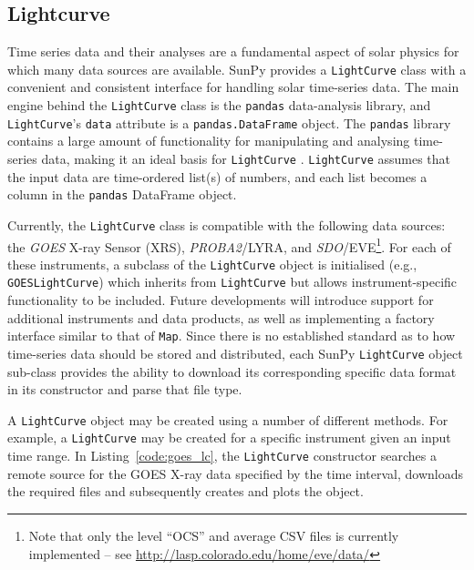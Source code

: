 \subsection{Lightcurve}\label{ssec:lightcurve}

Time series data and their analyses are a fundamental aspect of solar
physics for which many data sources are available.
SunPy provides a \texttt{LightCurve} class
with a convenient and consistent interface for handling solar time-series
data.  The main engine behind the \texttt{LightCurve} class is
the {\texttt{pandas}} data-analysis library, and 
\texttt{LightCurve}'s \texttt{data} attribute is a \texttt{pandas.DataFrame} 
object. The \texttt{pandas} library contains a large amount
of functionality for manipulating and analysing time-series data,
making it an ideal basis for \texttt{LightCurve} \citep{mckinney2012}.  \texttt{LightCurve}
assumes that the input data are time-ordered list(s) of numbers, and each
list becomes a column in the \texttt{pandas} DataFrame object.

Currently, the \texttt{LightCurve} class is compatible with the
following data sources: the \textit{GOES} X-ray Sensor (XRS), \textit{PROBA2}/LYRA, and \textit{SDO}/EVE\footnote{Note that only the level ``OCS'' and
average CSV files is currently implemented -- see \url{http://lasp.colorado.edu/home/eve/data/}}.  For each of these instruments, a subclass of the
\texttt{LightCurve} object is initialised
(e.g., \texttt{GOESLightCurve}) which inherits from
\texttt{LightCurve} but allows instrument-specific functionality to be
included.  Future developments will introduce support for additional
instruments and data products, as well as implementing a factory interface 
similar to that of \texttt{Map}.  Since there is no established standard
as to how time-series data should be stored and distributed, each SunPy 
\texttt{LightCurve} object sub-class provides the ability to download its corresponding 
specific data format in its constructor and parse that file type.

A \texttt{LightCurve} object may be created using a number of different methods. 
For example, a \texttt{LightCurve} may be created for a specific instrument given
an input time range. In Listing~\ref{code:goes_lc}, 
the \texttt{LightCurve} constructor searches a remote source for the GOES X-ray 
data specified by the time interval, downloads the required files and 
subsequently creates and plots the object.

